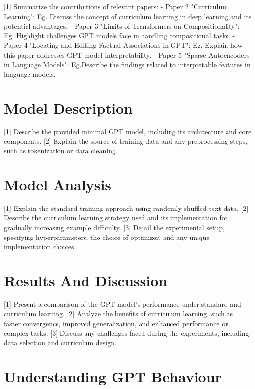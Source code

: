 \documentclass[12pt]{article}
\theoremstyle{plain}
\theoremstyle{definition}
\theoremstyle{remark}
\begin{document}
[1] Summarize the contributions of relevant papers:
- Paper 2 "Curriculum Learning": Eg. Discuss the concept of curriculum learning in deep learning and its potential advantages.
- Paper 3 "Limits of Transformers on Compositionality": Eg. Highlight challenges GPT models face in handling compositional tasks.
- Paper 4 "Locating and Editing Factual Associations in GPT": Eg. Explain how this paper addresses GPT model interpretability.
- Paper 5 "Sparse Autoencoders in Language Models": Eg.Describe the findings related to interpretable features in language models.

\section{Model Description}
\label{sec:model_desc}

[1] Describe the provided minimal GPT model, including its architecture and core components.
[2] Explain the source of training data and any preprocessing steps, such as tokenization or data cleaning.

\section{Model Analysis}
\label{sec:model_analysis}

[1] Explain the standard training approach using randomly shuffled text data.
[2] Describe the curriculum learning strategy used and its implementation for gradually increasing example difficulty.
[3] Detail the experimental setup, specifying hyperparameters, the choice of optimizer, and any unique implementation choices.

\section{Results And Discussion}
\label{sec:result_discussion}

[1] Present a comparison of the GPT model's performance under standard and curriculum learning.
[2] Analyze the benefits of curriculum learning, such as faster convergence, improved generalization, and enhanced performance on complex tasks.
[3] Discuss any challenges faced during the experiments, including data selection and curriculum design.

\section{Understanding GPT Behaviour}
\label{sec:gpt_behaviour}
\end{document}
